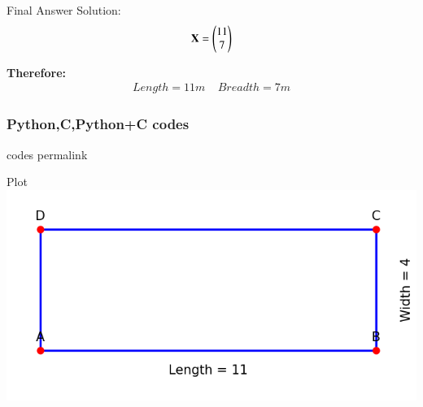 \documentclass{beamer}
\begin{document}
\begin{frame}{Final Answer}
Solution:
\begin{align}
\mathbf{X} = \begin{pmatrix}11 \\ 7\end{pmatrix}
\end{align}

\textbf{Therefore:}
\begin{align}
 Length = 11m \ \ \ \ \ 
 Breadth = 7m
\end{align}
\end{frame}

\begin{frame}[fragile]
\frametitle{Python,C,Python+C codes}
codes permalink
\end{frame}

\begin{frame}{Plot}
    \centering
    \includegraphics[width=\columnwidth, height=0.8\textheight, keepaspectratio]{figs/fig.png}
\end{frame}
\end{document}
